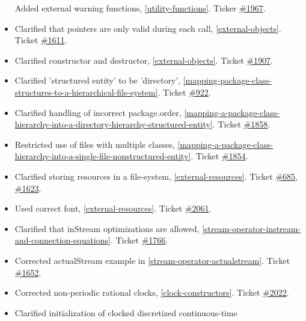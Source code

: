 \begin{itemize}
  Added external warning functions, \autoref{utility-functions}. Ticker
  \href{https://github.com/modelica/ModelicaSpecification/issues/1967}{\#1967}.
\item
  Clarified that pointers are only valid during each call, \autoref{external-objects}. Ticket
  \href{https://github.com/modelica/ModelicaSpecification/issues/1611}{\#1611}.
\item
  Clarified constructor and destructor, \autoref{external-objects}. Ticket
  \href{https://github.com/modelica/ModelicaSpecification/issues/1907}{\#1907}.
\item
  Clarified 'structured entity' to be 'directory', \autoref{mapping-package-class-structures-to-a-hierarchical-file-system}.
  Ticket \href{https://github.com/modelica/ModelicaSpecification/issues/922}{\#922}.
\item
  Clarified handling of incorrect package.order, \autoref{mapping-a-package-class-hierarchy-into-a-directory-hierarchy-structured-entity}.
  Ticket \href{https://github.com/modelica/ModelicaSpecification/issues/1858}{\#1858}.
\item
  Restricted use of files with multiple classes, \autoref{mapping-a-package-class-hierarchy-into-a-single-file-nonstructured-entity}.
  Ticket \href{https://github.com/modelica/ModelicaSpecification/issues/1854}{\#1854}.
\item
  Clarified storing resources in a file-system, \autoref{external-resources}. Ticket
  \href{https://github.com/modelica/ModelicaSpecification/issues/685}{\#685},
  \href{https://github.com/modelica/ModelicaSpecification/issues/1623}{\#1623}.
\item
  Used correct font, \autoref{external-resources}. Ticket
  \href{https://github.com/modelica/ModelicaSpecification/issues/2061}{\#2061}.
\item
  Clarified that inStream optimizations are allowed, \autoref{stream-operator-instream-and-connection-equations}.
  Ticket \href{https://github.com/modelica/ModelicaSpecification/issues/1766}{\#1766}.
\item
  Corrected actualStream example in \autoref{stream-operator-actualstream}. Ticket
  \href{https://github.com/modelica/ModelicaSpecification/issues/1652}{\#1652}.
\item
  Corrected non-periodic rational clocks, \autoref{clock-constructors}. Ticket
  \href{https://github.com/modelica/ModelicaSpecification/issues/2022}{\#2022}.
\item
  Clarified initialization of clocked discretized continuous-time

\end{itemize}

